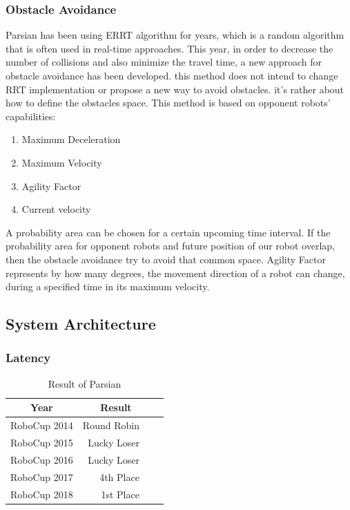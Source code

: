 \documentclass{llncs}
\begin{document}
\subsubsection{Obstacle Avoidance} 
Parsian has been using ERRT algorithm for years, which is a random algorithm that is often used in real-time approaches. This year, in order to decrease the number of collisions and also minimize the travel time, a new approach for obstacle avoidance has been developed. this method does not intend to change RRT implementation or propose a new way to avoid obstacles. it’s rather about how to define the obstacles space.
This method is based on opponent robots’ capabilities:
\begin{enumerate}  
\item Maximum Deceleration
\item Maximum Velocity
\item Agility Factor
\item Current velocity 
\end{enumerate}
A probability area can be chosen for a certain upcoming time interval.
    If the probability area for opponent robots and future position of our robot  overlap, then the obstacle avoidance try to avoid that common space.
Agility Factor represents by how many degrees, the movement direction of a robot can change, during a specified time in its maximum velocity.

\subsection{System Architecture}
\subsubsection{Latency}
\begin{table}
\caption{Result of Parsian}
\begin{center}
\begin{tabular}{r@{\quad}rcl}
\hline
\multicolumn{1}{c}{\rule{0pt}{12pt}Year} & \multicolumn{2}{c}{Result}\\[2pt]
\hline\rule{0pt}{12pt}
RoboCup 2014  &     Round Robin& \\
RoboCup 2015  &     Lucky Loser& \\
RoboCup 2016  &     Lucky Loser& \\
RoboCup 2017  &     4th Place  & \\
RoboCup 2018  & 	1st Place  & \\[2pt]
\hline
\end{tabular}
\end{center}
\end{table}
%
\end{document}
